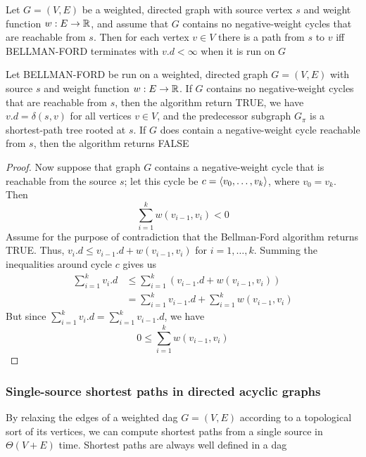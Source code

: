 \documentclass[11pt]{article}
\begin{document}
\begin{corollary}[]
Let \(G=(V,E)\) be a weighted, directed graph with source vertex \(s\) and weight
function \(w:E\to\mathbb{R}\), and assume that \(G\) contains no negative-weight cycles that are reachable
from \(s\). Then for each vertex \(v\in V\) there is a path from \(s\) to \(v\) iff BELLMAN-FORD
terminates with \(v.d<\infty\) when it is run on \(G\)
\end{corollary}

\begin{theorem}
Let BELLMAN-FORD be run on a weighted, directed graph \(G=(V,E)\) with source \(s\) and weight
function \(w:E\to\mathbb{R}\). If \(G\) contains no negative-weight cycles that are reachable from \(s\),
then the algorithm return TRUE, we have \(v.d=\delta(s,v)\) for all vertices \(v\in V\), and the
predecessor subgraph \(G_\pi\) is a shortest-path tree rooted at \(s\). If \(G\) does contain a
negative-weight cycle reachable from \(s\), then the algorithm returns FALSE
\end{theorem}

\begin{proof}
Now suppose that graph \(G\) contains a negative-weight cycle that is reachable from the
source \(s\); let this cycle be \(c=\langle v_0,\dots,v_k\rangle\), where \(v_0=v_k\). Then
\begin{equation*}
\sum_{i=1}^kw(v_{i-1},v_i)<0
\end{equation*}
Assume for the purpose of contradiction that the Bellman-Ford algorithm returns TRUE.
Thus, \(v_i.d\le v_{i-1}.d+w(v_{i-1},v_i)\) for \(i=1,\dots,k\). Summing the inequalities around
cycle \(c\) gives us
\begin{align*}
\sum_{i=1}^kv_i.d&\le\sum_{i=1}^k(v_{i-1}.d+w(v_{i-1},v_i))\\
&=\sum_{i=1}^kv_{i-1}.d+\sum_{i=1}^kw(v_{i-1},v_i)
\end{align*}
But since \(\sum_{i=1}^kv_i.d=\sum_{i=1}^kv_{i-1}.d\), we have
\begin{equation*}
0\le\sum_{i=1}^kw(v_{i-1},v_i)
\end{equation*}
\end{proof}

\begin{exercise}

\end{exercise}
\subsubsection{Single-source shortest paths in directed acyclic graphs}
\label{sec:orgc9c5445}
By relaxing the edges of a weighted dag \(G=(V,E)\) according to a topological sort of its
vertices, we can compute shortest paths from a single source in \(\Theta(V+E)\) time. Shortest paths
are always well defined in a dag
\end{document}
